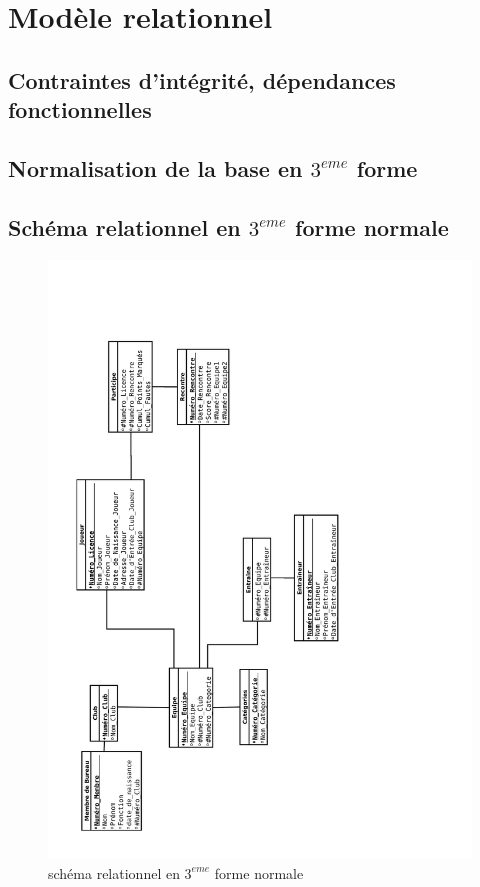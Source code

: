 \documentclass{article}
\begin{document}
\newpage
\section{Modèle relationnel}





\subsection{Contraintes d'intégrité, dépendances fonctionnelles}
 
\subsection{Normalisation de la base en $3^{eme}$ forme}

\newpage
\subsection{Schéma relationnel en $3^{eme}$ forme normale}

\begin{figure}[h!]
\centering
\includegraphics[scale = 0.35, angle = -90]{BasketBall_Relationnel.pdf}
\caption{schéma relationnel en $3^{eme}$ forme normale}
\end{figure}
\end{document}
